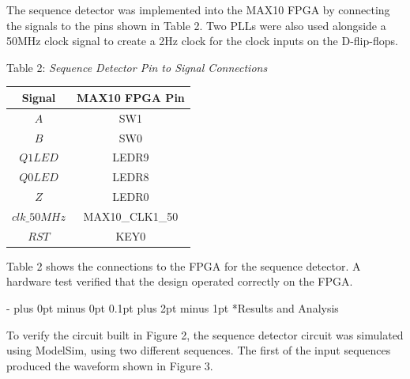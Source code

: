 \documentclass[\FontSize\FontUnit,letterpaper,oneside]{article}
\makeatletter
\renewcommand \section{
    \@startsection{section}{1}{\z@}
      {\dimexpr \FontSize\FontUnit * 2 - \parskip \relax plus 0pt minus 0pt}
      {0.1pt plus 2pt minus 1pt} %
      {\normalfont\normalsize\bfseries}}
\makeatother
\begin{document}
The sequence detector
was implemented into the MAX10 FPGA by connecting 
the signals to the pins shown in Table 2. Two PLLs were
also used alongside a 50MHz clock signal to create a 2Hz clock for the clock inputs
on the D-flip-flops.

\begin{center}
  Table 2: \textit{Sequence Detector Pin to Signal Connections}
\end{center}
\begin{center}
  \begin{NiceTabular}{|c|c|}
    \hline
    Signal & MAX10 FPGA Pin \\
    \hline
    \hline
    $A$ & SW1 \\
    \hline
    $B$ & SW0 \\
    \hline
    $Q1LED$ & LEDR9 \\
    \hline
    $Q0LED$ & LEDR8 \\
    \hline
    $Z$ & LEDR0 \\
    \hline
    $clk\_50MHz$ & MAX10\_CLK1\_50 \\
    \hline
    $RST$ & KEY0 \\
    \hline
  \end{NiceTabular}
\end{center}

Table 2 shows the connections to the FPGA for the sequence detector. A hardware test verified that
the design operated correctly on the FPGA.
  

\break

\section*{Results and Analysis}
\par To verify the circuit built in Figure 2, the sequence detector circuit was simulated using ModelSim,
using two different sequences. The first of the input sequences produced the waveform shown in Figure 3.
\end{document}
